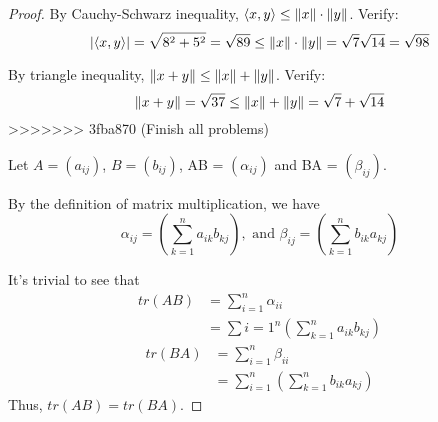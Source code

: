 \begin{homeworkProblem}
\begin{proof}
By Cauchy-Schwarz inequality, $\langle x, y \rangle \leq \left\lVert x \right\rVert \cdot \left\lVert y \right\rVert$.
Verify:
\[
|\langle x, y \rangle| = \sqrt{8^2 + 5^2} = \sqrt{89} \leq \left\lVert x \right\rVert\cdot\left\lVert y \right\rVert = \sqrt{7}\sqrt{14} = \sqrt{98}
\]

By triangle inequality, $\left\lVert x + y \right\rVert \leq \left\lVert x \right\rVert + \left\lVert y \right\rVert$. Verify:
\[
\left\lVert x + y \right\rVert = \sqrt{37} \leq \left\lVert x \right\rVert + \left\lVert y \right\rVert = \sqrt{7} + \sqrt{14}
\]
>>>>>>> 3fba870 (Finish all problems)

Let $A = (a_{ij})$, $B = (b_{ij})$, AB = $(\alpha_{ij})$ and BA = $(\beta_{ij})$.

By the definition of matrix multiplication, we have
\[
    \alpha_{ij} = (\sum_{k=1}^{n} a_{ik} b_{kj}), \text{ and }
    \beta_{ij} = (\sum_{k=1}^{n}b_{ik} a_{kj})
\]

It's trivial to see that
\[
\begin{aligned}
    tr(AB) &= \sum_{i=1}^{n} \alpha_{ii} \\
           &= \sum{i=1}^{n}\left(\sum_{k=1}^{n}a_{ik}b_{kj}\right)
\end{aligned}
\]
\[
\begin{aligned}
    tr(BA) &= \sum_{i=1}^{n} \beta_{ii} \\
           &= \sum_{i=1}^{n}\left(\sum_{k=1}^{n}b_{ik}a_{kj}\right)
\end{aligned}
\]
Thus, $tr(AB) = tr(BA)$.

\end{proof}
\end{homeworkProblem}
